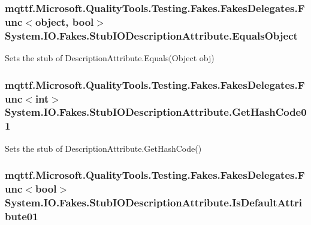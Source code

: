 \hypertarget{class_system_1_1_i_o_1_1_fakes_1_1_stub_i_o_description_attribute_ae612082b2eba60822fb970043a238bf7}{
\subsubsection[{Equals\-Object}]{\setlength{\rightskip}{0pt plus 5cm}mqttf.\-Microsoft.\-Quality\-Tools.\-Testing.\-Fakes.\-Fakes\-Delegates.\-Func$<$object, bool$>$ System.\-I\-O.\-Fakes.\-Stub\-I\-O\-Description\-Attribute.\-Equals\-Object}}\label{class_system_1_1_i_o_1_1_fakes_1_1_stub_i_o_description_attribute_ae612082b2eba60822fb970043a238bf7}


Sets the stub of Description\-Attribute.\-Equals(\-Object obj)

\hypertarget{class_system_1_1_i_o_1_1_fakes_1_1_stub_i_o_description_attribute_a4448d6670a9f35f02295f98093131d3a}{
\subsubsection[{Get\-Hash\-Code01}]{\setlength{\rightskip}{0pt plus 5cm}mqttf.\-Microsoft.\-Quality\-Tools.\-Testing.\-Fakes.\-Fakes\-Delegates.\-Func$<$int$>$ System.\-I\-O.\-Fakes.\-Stub\-I\-O\-Description\-Attribute.\-Get\-Hash\-Code01}}\label{class_system_1_1_i_o_1_1_fakes_1_1_stub_i_o_description_attribute_a4448d6670a9f35f02295f98093131d3a}


Sets the stub of Description\-Attribute.\-Get\-Hash\-Code()

\hypertarget{class_system_1_1_i_o_1_1_fakes_1_1_stub_i_o_description_attribute_a4b981c8c5c2dde8dcc3d358372ed7149}{
\subsubsection[{Is\-Default\-Attribute01}]{\setlength{\rightskip}{0pt plus 5cm}mqttf.\-Microsoft.\-Quality\-Tools.\-Testing.\-Fakes.\-Fakes\-Delegates.\-Func$<$bool$>$ System.\-I\-O.\-Fakes.\-Stub\-I\-O\-Description\-Attribute.\-Is\-Default\-Attribute01}}\label{class_system_1_1_i_o_1_1_fakes_1_1_stub_i_o_description_attribute_a4b981c8c5c2dde8dcc3d358372ed7149}


